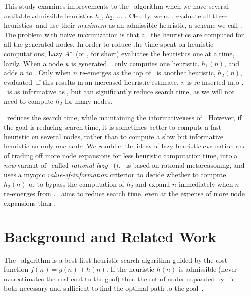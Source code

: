 
This study examines improvements to the \astar~algorithm when we have
several available admissible heuristics $h_1$, $h_2$, ... . Clearly, we can evaluate all
these heuristics, and use their {\em maximum} as an admissible
heuristic, a scheme we call \astarmax.  The problem with naive
maximization is that all the heuristics are computed for all the
generated nodes.  In order to reduce the time spent on heuristic
computations, Lazy $A^\ast$ (or \lazyastar, for short) evaluates the
heuristics one at a time, lazily.  When a node $n$ is generated,
\lazyastar~only computes one heuristic, $h_1(n)$, and adds $n$ to
\OPEN.  Only when $n$ re-emerges as the top of \OPEN~is another
heuristic, $h_2(n)$, evaluated; if this results in an increased
heuristic estimate, $n$ is re-inserted into \OPEN.  \lazyastar~is as
informative as \astarmax, but can significantly reduce search time, as
we will not need to compute $h_2$ for many nodes.

\lazyastar~reduces the search time, while maintaining the informativeness of \astarmax.
However, if the goal is reducing search time, it is sometimes better
to compute a fast heuristic on several nodes, rather than to compute a
slow but informative heuristic on only one node. We combine the ideas
of lazy heuristic evaluation and of trading off more node expansions
for less heuristic computation time, into a {\em new} variant of
\lazyastar~called {\em rational lazy} \astar~(\rationallazyastar).
\rationallazyastar~is based on rational metareasoning, and uses a
myopic {\em value-of-information} criterion to decide whether to
compute $h_2(n)$ or to bypass the computation of $h_2$ and expand $n$
immediately when $n$ re-emerges from \OPEN. \rationallazyastar~aims to
reduce search time, even at the expense of more node expansions than
\astarmax.

\section{Background and Related Work}

The \astar~algorithm \cite{ASTR68} is a best-first heuristic search
algorithm guided by the cost function $f(n)=g(n)+h(n)$.  If the
heuristic $h(n)$ is admissible (never overestimates the real cost to
the goal) then the set of nodes expanded by \astar~is both necessary
and sufficient to find the optimal path to the goal~\cite{ASTR85}.

